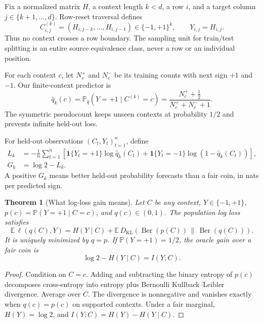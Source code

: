 \documentclass[10pt,twoside]{article}
\theoremstyle{noteplain}
\newtheorem{theorem}{Theorem}
\theoremstyle{definition}
\newcommand{\E}{\mathbb{E}}
\newcommand{\Prb}{\mathbb{P}}
\newcommand{\KL}{D_{\mathrm{KL}}}
\newcommand{\Ber}{\operatorname{Ber}}
\newcommand{\ind}{\mathbf{1}}
\begin{document}
Fix a normalized matrix $H$, a context length $k<d$, a row $i$, and a target column $j\in\{k+1,\ldots,d\}$.  Row-reset traversal defines
\begin{equation}\label{eq:context}
C^{(k)}_{i,j}=(H_{i,j-k},\ldots,H_{i,j-1})\in\{-1,+1\}^k,
\qquad
Y_{i,j}=H_{i,j}.
\end{equation}
Thus no context crosses a row boundary.  The sampling unit for train/test splitting is an entire source equivalence class, never a row or an individual position.

For each context $c$, let $N_c^+$ and $N_c^-$ be its training counts with next sign $+1$ and $-1$.  Our finite-context predictor is
\begin{equation}\label{eq:kt}
\widehat q_k(c)
=\Prb_{\widehat q}(Y=+1\mid C^{(k)}=c)
=\frac{N_c^++\tfrac12}{N_c^++N_c^-+1}.
\end{equation}
The symmetric pseudocount keeps unseen contexts at probability $1/2$ and prevents infinite held-out loss.

For held-out observations $(C_t,Y_t)_{t=1}^n$, define
\begin{align}
L_k
&=-\frac1n\sum_{t=1}^n
\left[
\ind\{Y_t=+1\}\log \widehat q_k(C_t)
+\ind\{Y_t=-1\}\log(1-\widehat q_k(C_t))
\right],\label{eq:loss}\\
G_k&=\log 2-L_k.\label{eq:gain}
\end{align}
A positive $G_k$ means better held-out probability forecasts than a fair coin, in nats per predicted sign.

\begin{theorem}[What log-loss gain means]\label{thm:logloss}
Let $C$ be any context, $Y\in\{-1,+1\}$, $p(c)=\Prb(Y=+1\mid C=c)$, and $q(c)\in(0,1)$.  The population log loss satisfies
\begin{equation}\label{eq:decomposition}
\E\,\ell(q(C),Y)
=H(Y\mid C)
+\E\,\KL\!\left(\Ber(p(C))\,\middle\|\,\Ber(q(C))\right).
\end{equation}
It is uniquely minimized by $q=p$.  If $\Prb(Y=+1)=1/2$, the oracle gain over a fair coin is
\begin{equation}
\log2-H(Y\mid C)=I(Y;C).
\end{equation}
\end{theorem}

\begin{proof}
Condition on $C=c$.  Adding and subtracting the binary entropy of $p(c)$ decomposes cross-entropy into entropy plus Bernoulli Kullback--Leibler divergence.  Average over $C$.  The divergence is nonnegative and vanishes exactly when $q(c)=p(c)$ on supported contexts.  Under a fair marginal, $H(Y)=\log2$, and $I(Y;C)=H(Y)-H(Y\mid C)$.
\end{proof}
\end{document}
